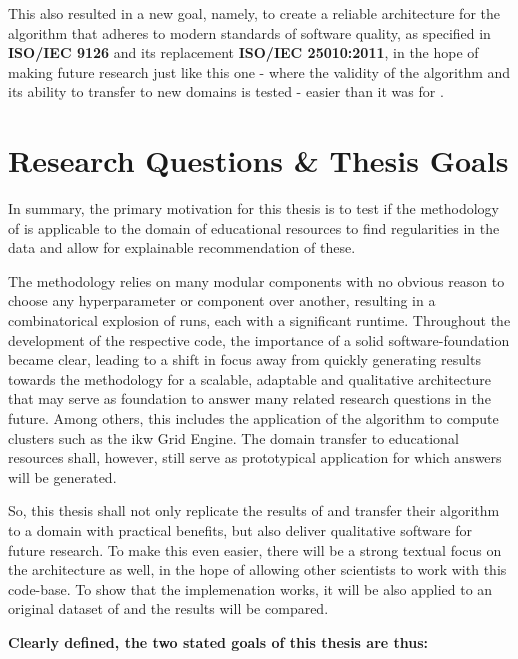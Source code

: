 This also resulted in a new goal, namely, to create a reliable architecture for the algorithm that adheres to modern standards of software quality, as specified in \textbf{ISO/IEC 9126} and its replacement \textbf{ISO/IEC 25010:2011}, in the hope of making future research just like this one - where the validity of the algorithm and its ability to transfer to new domains is tested - easier than it was for \me.



\section{Research Questions \& Thesis Goals}
\label{sec:goals_research_questions}

In summary, the primary motivation for this thesis is to test if the methodology of \textcite{Derrac2015} is applicable to the domain of educational resources to find regularities in the data and allow for explainable recommendation of these. 

The methodology relies on many modular components with no obvious reason to choose any hyperparameter or component over another, resulting in a combinatorical explosion of runs, each with a significant runtime. Throughout the development of the respective code, the importance of a solid software-foundation became clear, leading to a shift in focus away from quickly generating results towards the methodology for a scalable, adaptable and qualitative architecture that may serve as foundation to answer many related research questions in the future. Among others, this includes the application of the algorithm to compute clusters such as the \gls{ikw} Grid Engine. The domain transfer to educational resources shall, however, still serve as prototypical application for which answers will be generated.

So, this thesis shall not only replicate the results of \cite{Derrac2015} and transfer their algorithm to a domain with practical benefits, but also deliver qualitative software for future research. To make this even easier, there will be a strong textual focus on the architecture as well, in the hope of allowing other scientists to work with this code-base. To show that the implemenation works, it will be also applied to an original dataset of \cite{Derrac2015} and the results will be compared.

\textbf{Clearly defined, the two stated goals of this thesis are thus:}

